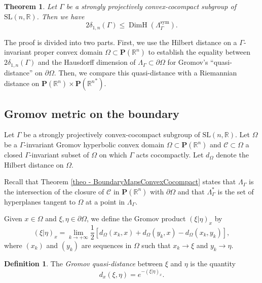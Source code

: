 \documentclass[JEP,XML,SOM,Unicode,NoEqCountersInSection,NoFloatCountersInSection,published]{cedram}
\newtheorem{theorem}[theo]{Theorem}
\theoremstyle{definition}
\newtheorem{defi}[theo]{Definition}
\newcommand{\proj}{\mathbf{P}}
\newcommand{\R}{\mathbb{R}}
\newcommand{\cC}{\mathcal{C}}
\newcommand{\SL}{\mathrm{SL}}
\DeclareMathOperator{\DimH}{DimH}
\let\G\Gamma
\begin{document}
\begin{theorem} \label{th - lower bound}
Let $\G$ be a strongly projectively convex-cocompact subgroup of $\SL(n,\R)$. Then we have
\[ 2\delta_{{1,n}}(\G) \leq \DimH(\Lambda^{\mathrm{sym}}_\G). \]
\end{theorem}

The proof is divided into two parts. First, we use the Hilbert distance on a $\G$\nobreakdash-in\-vari\-ant proper convex domain $\Omega\subset\proj(\R^n)$ to establish the equality between $2\delta_{1,n}(\G)$ and the Hausdorff dimension of $\Lambda_\G\subset \partial\Omega$ for Gromov's ``quasi-distance'' on $\partial \Omega$. Then, we compare this quasi-distance with a Riemannian distance on $\proj(\R^n)\times\proj({\R^n}^*)$.

\subsection{Gromov metric on the boundary}\label{subsec-gromov metric on the boundary}
Let $\G$ be a strongly projectively convex-cocompact subgroup of $\SL(n,\R)$. Let $\Omega$ be a $\G$-invariant Gromov hyperbolic convex domain $\Omega\subset\proj(\R^n)$ and $\cC\subset \Omega$ a closed $\G$-invariant subset of $\Omega$ on which $\G$ acts cocompactly. Let $d_\Omega$ denote the Hilbert distance on $\Omega$.

Recall that Theorem \ref{theo - BoundaryMapsConvexCocompact} states that $\Lambda_\Gamma$ is the intersection of the closure of $\cC$ in $\proj(\R^n)$ with $\partial \Omega$ and that $\Lambda_\G^*$ is the set of hyperplanes tangent to $\Omega$ at a point in $\Lambda_\G$.

Given $x\in \Omega$ and $\xi,\eta\in \partial\Omega$, we define the Gromov product $(\xi\vert\eta)_x$ by
\[( \xi \vert \eta)_x = \lim_{k\to +\infty} \frac{1}{2}[ d_\Omega(x_k, x) +d_\Omega(y_k, x) -d_\Omega(x_k, y_k)],\]
where $(x_k)$ and $(y_k)$ are sequences in $\Omega$ such that $x_k \to \xi $ and $y_k\to \eta$.

\begin{defi} \label{def - gromov distance}
The \emph{Gromov quasi-distance} between $\xi$ and $\eta$ is the quantity
\[d_x(\xi, \eta)= e^{-( \xi\vert \eta)_x }.\]
\end{defi}
\end{document}
